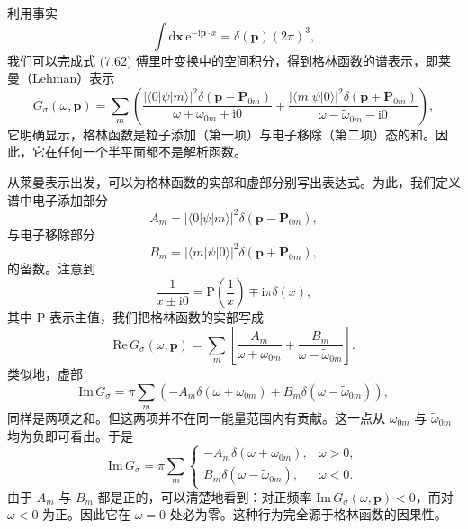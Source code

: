 利用事实
\begin{equation*}
\int\mathrm{d}\mathbf{x}\,\mathrm{e}^{-\mathrm{i}\mathbf{p}\cdot x}=\delta(\mathbf{p})(2\pi)^{3},\tag{7.66}
\end{equation*}
我们可以完成式 (7.62) 傅里叶变换中的空间积分，得到格林函数的谱表示，即莱曼（Lehman）表示
\begin{equation*}
G_{\sigma}(\omega,\mathbf{p})=\sum_{m}\left(\frac{|\langle 0|\psi|m\rangle|^{2}\delta(\mathbf{p}-\mathbf{P}_{0m})}{\omega+\omega_{0m}+\mathrm{i}0}+\frac{|\langle m|\psi|0\rangle|^{2}\delta(\mathbf{p}+\mathbf{P}_{0m})}{\omega-\tilde{\omega}_{0m}-\mathrm{i}0}\right),\tag{7.67}
\end{equation*}
它明确显示，格林函数是粒子添加（第一项）与电子移除（第二项）态的和。因此，它在任何一个半平面都不是解析函数。

从莱曼表示出发，可以为格林函数的实部和虚部分别写出表达式。为此，我们定义谱中电子添加部分
\begin{equation*}
A_{m}=|\langle 0|\psi|m\rangle|^{2}\delta(\mathbf{p}-\mathbf{P}_{0m}),\tag{7.68}
\end{equation*}
与电子移除部分
\begin{equation*}
B_{m}=|\langle m|\psi|0\rangle|^{2}\delta(\mathbf{p}+\mathbf{P}_{0m}),\tag{7.69}
\end{equation*}
的留数。注意到
\begin{equation*}
\frac{1}{x\pm\mathrm{i}0}=\mathrm{P}\left(\frac{1}{x}\right)\mp\mathrm{i}\pi\delta(x),\tag{7.70}
\end{equation*}
其中 $\mathrm{P}$ 表示主值，我们把格林函数的实部写成
\begin{equation*}
\mathrm{Re}\,G_{\sigma}(\omega,\mathbf{p})=\sum_{m}\left[\frac{A_{m}}{\omega+\omega_{0m}}+\frac{B_{m}}{\omega-\tilde{\omega}_{0m}}\right].\tag{7.71}
\end{equation*}
类似地，虚部
\begin{equation*}
\mathrm{Im}\,G_{\sigma}=\pi\sum_{m}\left(-A_{m}\delta(\omega+\omega_{0m})+B_{m}\delta(\omega-\tilde{\omega}_{0m})\right),\tag{7.72}
\end{equation*}
同样是两项之和。但这两项并不在同一能量范围内有贡献。这一点从 $\omega_{0m}$ 与 $\tilde{\omega}_{0m}$ 均为负即可看出。于是
\begin{equation*}
\mathrm{Im}\,G_{\sigma}=\pi\sum_{m}
\begin{cases}
-A_{m}\delta(\omega+\omega_{0m}), & \omega>0,\\
B_{m}\delta(\omega-\tilde{\omega}_{0m}), & \omega<0.
\end{cases}\tag{7.73}
\end{equation*}
由于 $A_{m}$ 与 $B_{m}$ 都是正的，可以清楚地看到：对正频率 $\mathrm{Im}\,G_{\sigma}(\omega,\mathbf{p})<0$，而对 $\omega<0$ 为正。因此它在 $\omega=0$ 处必为零。这种行为完全源于格林函数的因果性。

